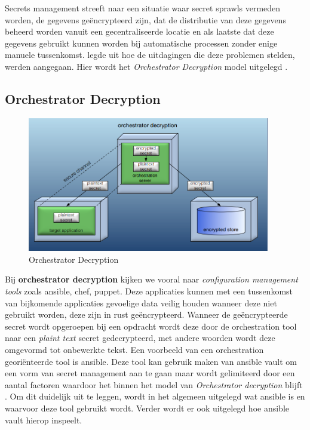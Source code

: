 Secrets management streeft naar een situatie waar secret sprawls vermeden worden, de gegevens geëncrypteerd zijn, dat de distributie van deze gegevens beheerd worden vanuit een gecentraliseerde locatie en als laatste dat deze gegevens gebruikt kunnen worden bij automatische processen zonder enige manuele tussenkomst. \textcite{Somerfield2015} legde uit hoe de uitdagingen die deze problemen stelden, werden aangegaan. Hier wordt het \textit{Orchestrator Decryption} model uitgelegd \autocite{Somerfield2015}. 

\subsection{Orchestrator Decryption} 

\begin{figure}[htbp]
\centerline{\includegraphics[width=400]{bachproef/img/orchestrator decryption.png}}
\caption{Orchestrator Decryption \autocite{Somerfield2015}}
\label{fig}
\end{figure}

Bij \textbf{orchestrator decryption} kijken we vooral naar \textit{configuration management tools} zoals ansible, chef, puppet. Deze applicaties kunnen met een tussenkomst van bijkomende applicaties gevoelige data veilig houden wanneer deze niet gebruikt worden, deze zijn in rust geëncrypteerd. Wanneer de geëncrypteerde secret wordt opgeroepen bij een opdracht wordt deze door de orchestration tool naar een \textit{plaint text} secret gedecrypteerd, met andere woorden wordt deze omgevormd tot onbewerkte tekst. Een voorbeeld van een orchestration georiënteerde tool is ansible. Deze tool kan gebruik maken van ansible vault om een vorm van secret management aan te gaan maar wordt gelimiteerd door een aantal factoren waardoor het binnen het model van \textit{Orchestrator decryption} blijft \autocite{Somerfield2015}. Om dit duidelijk uit te leggen, wordt in het algemeen uitgelegd wat ansible is en waarvoor deze tool gebruikt wordt. Verder wordt er ook uitgelegd hoe ansible vault hierop inspeelt. \newpage


